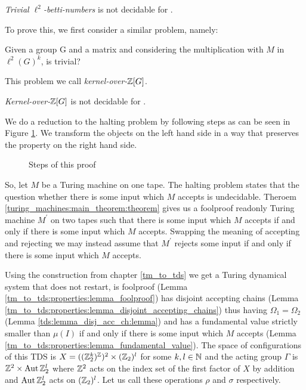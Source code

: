 \begin{Theorem}
	\label{zero-divisor-problem:trivial_betti_numbers}
	\emph{Trivial $\ell^2$-betti-numbers} is not decidable for .
\end{Theorem}

To prove this, we first consider a similar problem, namely:

Given a group G and a matrix 
and considering the multiplication with $M$ in $\ell^2(G)^k$, is  trivial?

This problem we call \emph{kernel-over-$\mathbb{Z}[G]$}.

\begin{Theorem}
	\label{zero-divisor-problem:kernel-over-zg}
	\emph{Kernel-over-$\mathbb{Z}[G]$} is not decidable for .
\end{Theorem}

\proof
	We do a reduction to the halting problem by following steps as can be seen in Figure \ref{zero_divisor_problem:main_theorem:fig_proof_plan}.
	We transform the objects on the left hand side in a way that preserves the property on the right hand side.
	\begin{figure}
		\centering
		
		\caption{Steps of this proof}
		\label{zero_divisor_problem:main_theorem:fig_proof_plan}
	\end{figure}
	So, let $M$ be a Turing machine on one tape.
	The halting problem states that the question whether there is some input which $M$ accepts is undecidable.
	Theroem \ref{turing_machines:main_theorem:theorem} gives us a foolproof readonly Turing machine $M^\prime$ on two tapes such that there is some input which $M$ accepts if and only if there is some input which $M$ accepts.\footnotemark
	Swapping the meaning of accepting and rejecting we may instead assume that $M^\prime$ rejects some input if and only if there is some input which $M$ accepts.

	Using the construction from chapter \ref{tm_to_tds} we get a Turing dynamical system that
	does not restart,
	is foolproof (Lemma \ref{tm_to_tds:properties:lemma_foolproof})
	has disjoint accepting chains (Lemma \ref{tm_to_tds:properties:lemma_disjoint_accepting_chains})
	thus having $\Omega_1 = \Omega_2$ (Lemma \ref{tds:lemma_disj_acc_ch:lemma}) and
	has a fundamental value strictly smaller than $\mu(I)$ if and only if there is some input which $M$ accepts (Lemma \ref{tm_to_tds:properties:lemma_fundamental_value}).
	The space of configurations of this TDS is $X = ((\mathbb{Z}_2^k)^{\mathbb{Z}})^2 \times (\mathbb{Z}_2)^l$ for some $k, l \in \mathbb{N}$
	and the acting group $\Gamma$ is $\mathbb{Z}^2 \times \operatorname{Aut} \mathbb{Z}_2^l$
	where $\mathbb{Z}^2$ acts on the index set of the first factor of $X$ by addition
	and $\operatorname{Aut} \mathbb{Z}_2^l$ acts on $(\mathbb{Z}_2)^l$.
	Let us call these operations $\rho$ and $\sigma$ respectively.

